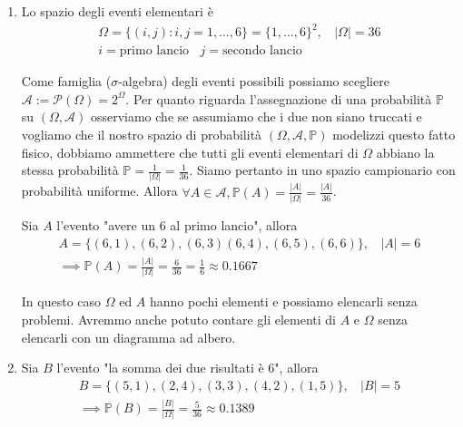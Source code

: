 \Soluzione
\begin{enumerate}
\item Lo spazio degli eventi elementari è\begin{gather*}
\Omega =\{( i,j) :i,j=1,\dotsc ,6\} =\{1,\dotsc ,6\}^{2} ,\ \ \ \ | \Omega | =36\\
i=\text{primo lancio} \ \ \ \ j=\text{secondo lancio}
\end{gather*}

Come famiglia ($\sigma $-algebra) degli eventi possibili possiamo scegliere $\mathcal{A} :=\mathcal{P}( \Omega ) =2^{\Omega }$. Per quanto riguarda l'assegnazione di una probabilità $\mathbb{P}$ su $( \Omega ,\mathcal{A})$ osserviamo che se assumiamo che i due non siano truccati e vogliamo che il nostro spazio di probabilità $( \Omega ,\mathcal{A} ,\mathbb{P})$ modelizzi questo fatto fisico, dobbiamo ammettere che tutti gli eventi elementari di $\Omega $ abbiano la stessa probabilità $\mathbb{P} =\frac{1}{| \Omega | } =\frac{1}{36}$. Siamo pertanto in uno spazio campionario con probabilità uniforme. Allora $\forall A\in \mathcal{A} ,\mathbb{P}( A) =\frac{| A| }{| \Omega | } =\frac{| A| }{36}$.

Sia $A$ l'evento "avere un $6$ al primo lancio", allora\begin{gather*}
A=\{( 6,1) ,( 6,2) ,( 6,3)( 6,4) ,( 6,5) ,( 6,6)\} ,\ \ \ \ | A| =6\\
\mathbb{\implies P}( A) =\frac{| A| }{| \Omega | } =\frac{6}{36} =\frac{1}{6} \approx 0.1667
\end{gather*}

\begin{oss}
In questo caso $\Omega $ ed $A$ hanno pochi elementi e possiamo elencarli senza problemi. Avremmo anche potuto contare gli elementi di $A$ e $\Omega $ senza elencarli con un diagramma ad albero.
\end{oss}
\item Sia $B$ l'evento "la somma dei due risultati è $6$", allora\begin{gather*}
B=\{( 5,1) ,( 2,4) ,( 3,3) ,( 4,2) ,( 1,5)\} ,\ \ \ \ | B| =5\\
\mathbb{\implies P}( B) =\frac{| B| }{| \Omega | } =\frac{5}{36} \approx 0.1389
\end{gather*}


\end{enumerate}
